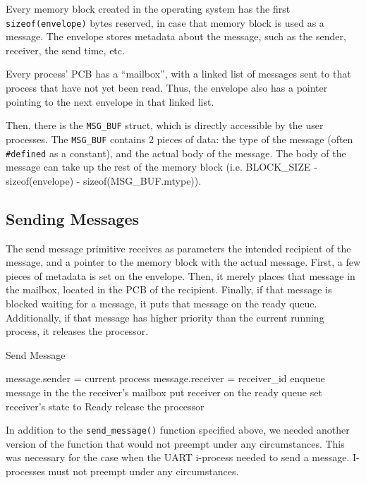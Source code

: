 \documentclass[12pt]{report}
\begin{document}
Every memory block created in the operating system has the first \texttt{sizeof(envelope)} bytes reserved, in case that memory block is used as a message. The envelope stores metadata about the message, such as the sender, receiver, the send time, etc. 

Every process' PCB has a ``mailbox'', with a linked list of messages sent to that process that have not yet been read. Thus, the envelope also has a pointer pointing to the next envelope in that linked list.

Then, there is the \texttt{MSG_BUF} struct, which is directly accessible by the user processes. The \texttt{MSG_BUF} contains 2 pieces of data: the type of the message (often \texttt{\#defined} as a constant), and the actual body of the message. The body of the message can take up the rest of the memory block (i.e. BLOCK_SIZE - sizeof(envelope) - sizeof(MSG_BUF.mtype)). 


\subsection{Sending Messages}

The send message primitive receives as parameters the intended recipient of the message, and a pointer to the memory block with the actual message. First, a few pieces of metadata is set on the envelope. Then, it merely places that message in the mailbox, located in the PCB of the recipient. Finally, if that message is blocked waiting for a message, it puts that message on the ready queue. Additionally, if that message has higher priority than the current running process, it releases the processor.

\begin{algorithm}[H]
	\caption{Send Message}
	\begin{algorithmic}[1]
			\State message.sender = current process
			\State message.receiver = receiver_id
			\State enqueue message in the the receiver's mailbox
				\State put receiver on the ready queue
				\State set receiver's state to Ready
					\State release the processor
				\EndIf
			\EndIf
		\EndFunction
	\end{algorithmic}
\end{algorithm}

In addition to the \texttt{send_message()} function specified above, we needed another version of the function that would not preempt under any circumstances. This was necessary for the case when the UART i-process needed to send a message. I-processes must not preempt under any circumstances.
\end{document}
